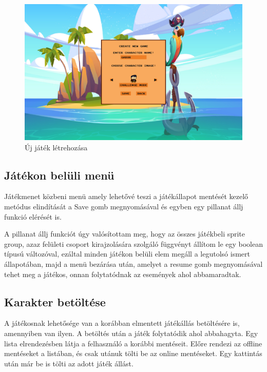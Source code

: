 \begin{figure}[H]
    \centering
    \includegraphics[width=15.0truecm]{images/newgame.png}
    \caption{Új játék létrehozása}
    \label{fig:Új játék létrehozása}
\end{figure}

\subsection{Játékon belüli menü}

\indent \indent Játékmenet közbeni menü amely lehetővé teszi a játékállapot mentését kezelő metódus elindítását a Save gomb megnyomásával és egyben egy pillanat állj funkció elérését is. 

A pillanat állj funkciót úgy valósítottam meg, hogy az összes játékbeli sprite group, azaz felületi csoport kirajzolására szolgáló függvényt állítom le egy boolean típusú változóval, ezáltal minden játékon belüli elem megáll a legutolsó ismert állapotában, majd a menü bezárása után, amelyet a resume gomb megnyomásával tehet meg a játékos, onnan folytatódnak az események ahol abbamaradtak.


\subsection{Karakter betöltése}
\indent \indent A játékosnak lehetősége van a korábban elmentett játékállás betöltésére is, amennyiben van ilyen. A betöltés után a játék folytatódik ahol abbahagyta. Egy lista elrendezésben látja a felhasználó a korábbi mentéseit. Előre rendezi az offline mentéseket a listában, és csak utánuk tölti be az online mentéseket. Egy kattintás után már be is tölti az adott játék állást.

